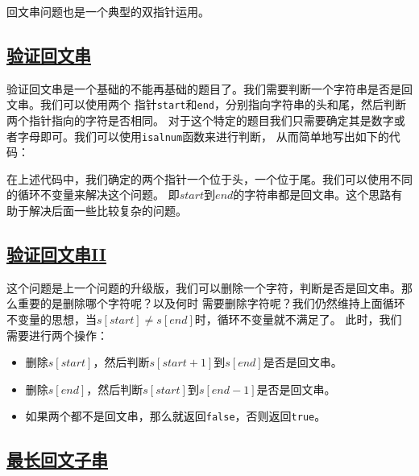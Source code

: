 \documentclass[../../main.tex]{subfiles}
\begin{document}
回文串问题也是一个典型的双指针运用。

\subsection{\href{https://leetcode-cn.com/problems/valid-palindrome/}{验证回文串}}

验证回文串是一个基础的不能再基础的题目了。我们需要判断一个字符串是否是回文串。我们可以使用两个
指针\verb|start|和\verb|end|，分别指向字符串的头和尾，然后判断两个指针指向的字符是否相同。
对于这个特定的题目我们只需要确定其是数字或者字母即可。我们可以使用\verb|isalnum|函数来进行判断，
从而简单地写出如下的代码：



\begin{kaobox}[title=思考]
  在上述代码中，我们确定的两个指针一个位于头，一个位于尾。我们可以使用不同的循环不变量来解决这个问题。
  即$start$到$end$的字符串都是回文串。这个思路有助于解决后面一些比较复杂的问题。
\end{kaobox}

\subsection{\href{https://leetcode-cn.com/problems/valid-palindrome-ii/}{验证回文串II}}

这个问题是上一个问题的升级版，我们可以删除一个字符，判断是否是回文串。那么重要的是删除哪个字符呢？以及何时
需要删除字符呢？我们仍然维持上面循环不变量的思想，当$s[start] \neq s[end]$时，循环不变量就不满足了。
此时，我们需要进行两个操作：

\begin{itemize}
  \item 删除$s[start]$，然后判断$s[start+1]$到$s[end]$是否是回文串。
  \item 删除$s[end]$，然后判断$s[start]$到$s[end-1]$是否是回文串。
  \item 如果两个都不是回文串，那么就返回\verb|false|，否则返回\verb|true|。
\end{itemize}



\subsection{\href{https://leetcode-cn.com/problems/longest-palindromic-substring/}{最长回文子串}}
\end{document}
